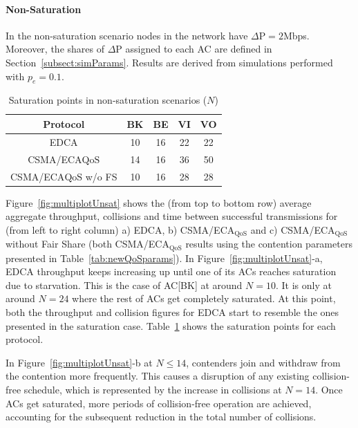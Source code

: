 \paragraph{Non-Saturation}

In the non-saturation scenario nodes in the network have $\Delta\text{P}=2$Mbps. Moreover, the shares of $\Delta\text{P}$ assigned to each AC are defined in Section~\ref{subsect:simParams}. Results are derived from simulations performed with $p_e=0.1$.

	\begin{table}[t]
		\centering
		\caption{Saturation points in non-saturation scenarios ($N$)}
		\label{tab:satPoints}
		\begin{tabular}{|c|c|c|c|c|}
			\hline
			{\bfseries Protocol} 				& {\bfseries BK} & {\bfseries BE} & {\bfseries VI} & {\bfseries VO}\\
			\hline
			EDCA						&	10		&	16		&		22	&	22\\	
			\hline
			CSMA/ECA${\text{QoS}}$		&	14		&	16		&		36	&	50\\
			\hline
			CSMA/ECA${\text{QoS}}$ w/o FS	&	10		&	16		&		28	&	28\\
			\hline
		\end{tabular}
	\end{table}

Figure~\ref{fig:multiplotUnsat} shows the (from top to bottom row) average aggregate throughput, collisions and time between successful transmissions for (from left to right column) a) EDCA, b) CSMA/ECA$_{\text{QoS}}$ and c) CSMA/ECA$_{\text{QoS}}$ without Fair Share (both CSMA/ECA$_{\text{QoS}}$ results using the contention parameters presented in Table~\ref{tab:newQoSparams}). In Figure~\ref{fig:multiplotUnsat}-a, EDCA throughput keeps increasing up until one of its ACs reaches saturation due to starvation. This is the case of AC[BK] at around $N=10$. It is only at around $N=24$ where the rest of ACs get completely saturated. At this point, both the throughput and collision figures for EDCA start to resemble the ones presented in the saturation case. Table~\ref{tab:satPoints} shows the saturation points for each protocol.

In Figure~\ref{fig:multiplotUnsat}-b at $N\leq 14$, contenders join and withdraw from the contention more frequently. This causes a disruption of any existing collision-free schedule, which is represented by the increase in collisions at $N=14$. Once ACs get saturated, more periods of collision-free operation are achieved, accounting for the subsequent reduction in the total number of collisions.

